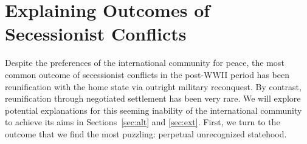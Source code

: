 \documentclass[11pt,letterpaper, notitlepage]{article}
\begin{document}


\section{Explaining Outcomes of Secessionist Conflicts} 
\label{sec:main}

Despite the preferences of the international community for peace, the most common outcome of secessionist conflicts in the post-WWII period has been reunification with the home state via outright military reconquest. By contrast, reunification through negotiated settlement has been very rare. We will explore potential explanations for this seeming inability of the international community to achieve its aims in Sections~\ref{sec:alt} and \ref{sec:ext}. First, we turn to the outcome that we find the most puzzling: perpetual unrecognized statehood.
\end{document}
